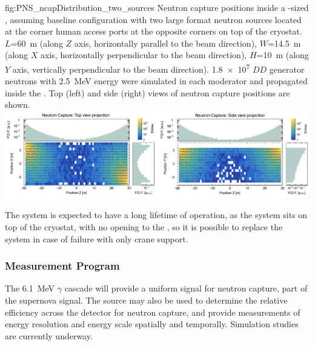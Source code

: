 \begin{dunefigure}{fig:PNS_ncapDistribution_two_sources}
{Neutron capture positions inside a -sized , assuming baseline configuration with two large format neutron sources located at the corner human access ports at the opposite corners on top of the cryostat. $L$=\SI{60}{\m} (along $Z$ axis, horizontally parallel to the beam direction), $W$=\SI{14.5}{\m} (along $X$ axis, horizontally perpendicular to the beam direction), $H$=\SI{10}{\m} (along $Y$ axis, vertically perpendicular to the beam direction). \num{1.8e7} $DD$ generator neutrons with \SI{2.5}{\MeV} energy were simulated in each moderator and propagated inside the . Top (left) and side (right) views of neutron capture positions are shown.}
\includegraphics[width=18cm]{graphics/PNS_ncapDistribution_two_sources.png}
\end{dunefigure}

The system is expected to have a long lifetime of operation, as the  system sits on top of the cryostat, with no opening to the , so it is possible to replace the system in case of failure with only crane support.



\subsubsection{Measurement Program}
\label{sec:sp-calib-sys-pns-meas}

The \SI{6.1}{\MeV} $\gamma$ cascade will provide a uniform signal for neutron capture, part of the supernova signal. The source may also be used to determine the relative efficiency across the detector for neutron capture, and provide measurements of energy resolution and energy scale spatially and temporally. Simulation studies are currently underway.

